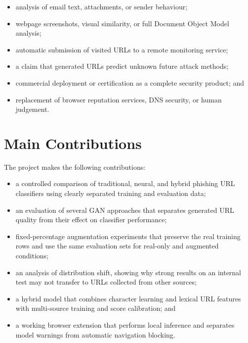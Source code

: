 \begin{itemize}
\item analysis of email text, attachments, or sender behaviour;
\item webpage screenshots, visual similarity, or full Document Object Model analysis;
\item automatic submission of visited URLs to a remote monitoring service;
\item a claim that generated URLs predict unknown future attack methods;
\item commercial deployment or certification as a complete security product; and
\item replacement of browser reputation services, DNS security, or human judgement.
\end{itemize}

\section{Main Contributions}

The project makes the following contributions:

\begin{itemize}
\item a controlled comparison of traditional, neural, and hybrid phishing URL
classifiers using clearly separated training and evaluation data;

\item an evaluation of several GAN approaches that separates generated URL
quality from their effect on classifier performance;

\item fixed-percentage augmentation experiments that preserve the real training
rows and use the same evaluation sets for real-only and augmented conditions;

\item an analysis of distribution shift, showing why strong results on an
internal test may not transfer to URLs collected from other sources;

\item a hybrid model that combines character learning and lexical URL features
with multi-source training and score calibration; and

\item a working browser extension that performs local inference and separates
model warnings from automatic navigation blocking.
\end{itemize}

